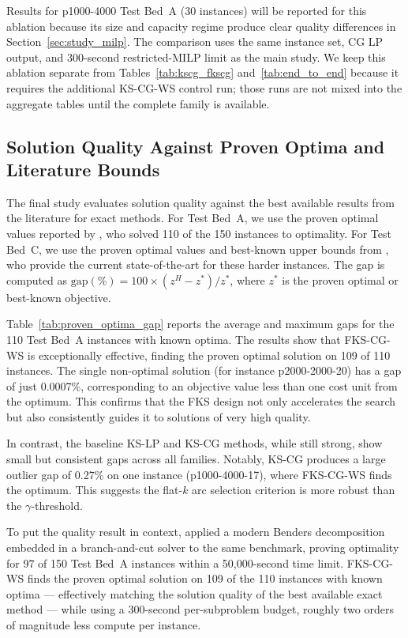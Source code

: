 Results for p1000-4000 Test Bed~A (30 instances) will be reported for this
ablation because its size and capacity regime produce clear quality differences
in Section~\ref{sec:study_milp}.
The comparison uses the same instance set, CG LP output, and 300-second
restricted-MILP limit as the main study.
We keep this ablation separate from Tables~\ref{tab:kscg_fkscg}
and~\ref{tab:end_to_end} because it requires the additional KS-CG-WS control
run; those runs are not mixed into the aggregate tables until the complete
family is available.

\subsection{Solution Quality Against Proven Optima and Literature Bounds}
\label{sec:study_proven_optima}

The final study evaluates solution quality against the best available results
from the literature for exact methods.
For Test Bed~A, we use the proven optimal values reported by
\citet{caserta2020corridor}, who solved 110 of the 150 instances to optimality.
For Test Bed~C, we use the proven optimal values and best-known upper bounds
from \citet{avella2021weakflow}, who provide the current state-of-the-art for
these harder instances.
The gap is computed as $\text{gap}(\%) = 100 \times (z^H - z^*) / z^*$, where
$z^*$ is the proven optimal or best-known objective.

Table~\ref{tab:proven_optima_gap} reports the average and maximum gaps for the
110 Test Bed~A instances with known optima.
The results show that FKS-CG-WS is exceptionally effective, finding the proven
optimal solution on 109 of 110 instances.
The single non-optimal solution (for instance p2000-2000-20) has a gap of just
0.0007\%, corresponding to an objective value less than one cost unit from the
optimum.
This confirms that the FKS design not only accelerates the search but also
consistently guides it to solutions of very high quality.

In contrast, the baseline KS-LP and KS-CG methods, while still strong, show
small but consistent gaps across all families.
Notably, KS-CG produces a large outlier gap of 0.27\% on one instance
(p1000-4000-17), where FKS-CG-WS finds the optimum. This suggests the flat-$k$
arc selection criterion is more robust than the $\gamma$-threshold.

To put the quality result in context, \citet{fischetti2016benders} applied
a modern Benders decomposition embedded in a branch-and-cut solver to the same
benchmark, proving optimality for 97 of 150 Test Bed~A instances within a
50{,}000-second time limit.
FKS-CG-WS finds the proven optimal solution on 109 of the 110 instances
with known optima --- effectively matching the solution quality of the best
available exact method --- while using a 300-second per-subproblem budget,
roughly two orders of magnitude less compute per instance.

